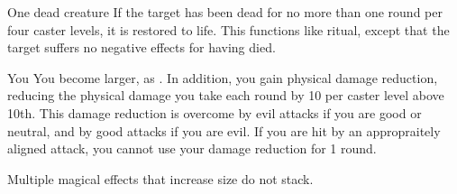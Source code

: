 \begin{spellheader}
\end{spellheader}
\begin{spelleffects}
    \begin{spelltarget}{One dead creature}
        \spelleffect If the target has been dead for no more than one round per four caster levels, it is restored to life. This functions like  ritual, except that the target suffers no negative effects for having died.
    \end{spelltarget}
    \spellline
\end{spelleffects}

\begin{spellheader}
    \spelldur{\durshort \dismissable}
\end{spellheader}
\begin{spelleffects}
    \begin{spelltarget}{You}
        \spellsuccess You become larger, as . In addition, you gain physical damage reduction, reducing the physical damage you take each round by 10  per caster level above 10th. This damage reduction is overcome by evil attacks if you are good or neutral, and by good attacks if you are evil. If you are hit by an appropraitely aligned attack, you cannot use your damage reduction for 1 round.
    \end{spelltarget}
\end{spelleffects}
\begin{spellfooter}
    \spellnotes Multiple magical effects that increase size do not stack.
\end{spellfooter}

\begin{comment}
\subsubsection{S}
\end{comment}

